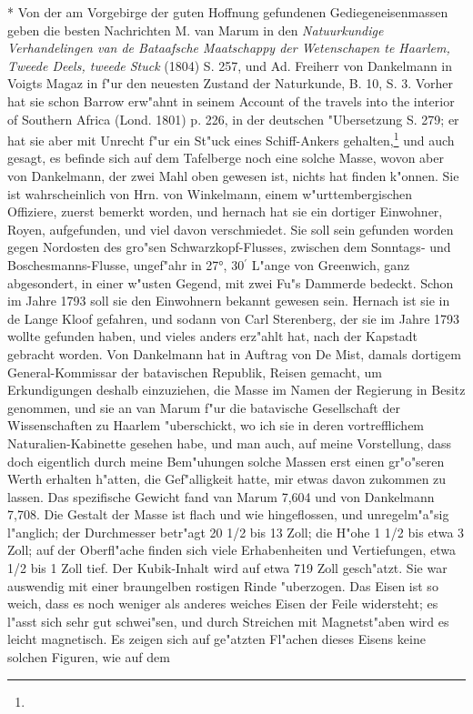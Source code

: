\documentclass[a4paper, 11pt, oneside, polutonikogreek, german]{article}
\begin{document}
* Von der am Vorgebirge der guten Hoffnung gefundenen Gediegeneisenmassen geben die besten Nachrichten M. van Marum in den \emph{Natuurkundige Verhandelingen van de Bataafsche Maatschappy der Wetenschapen te Haarlem, Tweede Deels, tweede Stuck} (1804) S. 257, und Ad. Freiherr von Dankelmann in Voigts Magaz in f"ur den neuesten Zustand der Naturkunde, B. 10, S. 3. Vorher hat sie schon Barrow erw"ahnt in seinem Account of the travels into the interior of Southern Africa (Lond. 1801) p. 226, in der deutschen "Ubersetzung S. 279; er hat sie aber mit Unrecht f"ur ein St"uck eines Schiff-Ankers gehalten,\footnote{} und auch gesagt, es befinde sich auf dem Tafelberge noch eine solche Masse, wovon aber von Dankelmann, der zwei Mahl oben gewesen ist, nichts hat finden k"onnen. Sie ist wahrscheinlich von Hrn. von Winkelmann, einem w"urttembergischen Offiziere, zuerst bemerkt worden, und hernach hat sie ein dortiger Einwohner, Royen, aufgefunden, und viel davon verschmiedet. Sie soll sein gefunden worden gegen Nordosten des gro"sen Schwarzkopf-Flusses, zwischen dem Sonntags- und Boschesmanns-Flusse, ungef"ahr in 27°, 30$^{\prime}$ L"ange von Greenwich, ganz abgesondert, in einer w"usten Gegend, mit zwei Fu"s Dammerde bedeckt. Schon im Jahre 1793 soll sie den Einwohnern bekannt gewesen sein. Hernach ist sie in de Lange Kloof gefahren, und sodann von Carl Sterenberg, der sie im Jahre 1793 wollte gefunden haben, und vieles anders erz"ahlt hat, nach der Kapstadt gebracht worden. Von Dankelmann hat in Auftrag von De Mist, damals dortigem General-Kommissar der batavischen Republik, Reisen gemacht, um Erkundigungen deshalb einzuziehen, die Masse im Namen der Regierung in Besitz genommen, und sie an van Marum f"ur die batavische Gesellschaft der Wissenschaften zu Haarlem "uberschickt, wo ich sie in deren vortrefflichem Naturalien-Kabinette gesehen habe, und man auch, auf meine Vorstellung, dass doch eigentlich durch meine Bem"uhungen solche Massen erst einen gr"o"seren Werth erhalten h"atten, die Gef"alligkeit hatte, mir etwas davon zukommen zu lassen. Das spezifische Gewicht fand van Marum 7,604 und von Dankelmann 7,708. Die Gestalt der Masse ist flach und wie hingeflossen, und unregelm"a"sig l"anglich; der Durchmesser betr"agt 20 1/2 bis 13 Zoll; die H"ohe 1 1/2 bis etwa 3 Zoll; auf der Oberfl"ache finden sich viele Erhabenheiten und Vertiefungen, etwa 1/2 bis 1 Zoll tief. Der Kubik-Inhalt wird auf etwa 719 Zoll gesch"atzt. Sie war auswendig mit einer braungelben rostigen Rinde "uberzogen. Das Eisen ist so weich, dass es noch weniger als anderes weiches Eisen der Feile widersteht; es l"asst sich sehr gut schwei"sen, und durch Streichen mit Magnetst"aben wird es leicht magnetisch. Es zeigen sich auf ge"atzten Fl"achen dieses Eisens keine solchen Figuren, wie auf dem 
\end{document}

